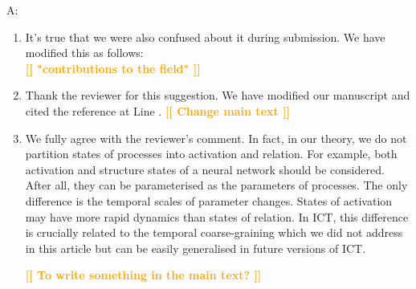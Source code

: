 \documentclass[utf8]{article}
\newenvironment{ans}  
    {\color{Black}\noindent A:}
    {~\newline}
\newcommand{\toWrite}[1]{\noindent
	\textcolor{Orange}{\textbf{[[ #1 ]]}}}
\begin{document}
    	\begin{ans}
    		\begin{enumerate}
    			\item It's true that we were also confused about it during submission. 
    			We have modified this as follows: \\
    			\toWrite{"contributions to the field"}
    			
    			\item Thank the reviewer for this suggestion. We have modified our manuscript and cited  the reference at Line . \toWrite{Change main text}
    			
    			\item We fully agree with the reviewer's comment. 
    			In fact, in our theory, we do not partition states of processes into activation and relation. For example, both activation and structure states of a neural network should be considered. After all, they can be parameterised as the parameters of processes. The only difference is the temporal scales of parameter changes. States of activation may have more rapid dynamics than states of relation. In ICT, this difference is crucially related to the temporal coarse-graining which we did not address in this article but can be easily generalised in future versions of ICT. 
    			
    			\toWrite{To write something in the main text?}
    			
    			
    		\end{enumerate}
    		
    	\end{ans}
        
        
\end{document}
